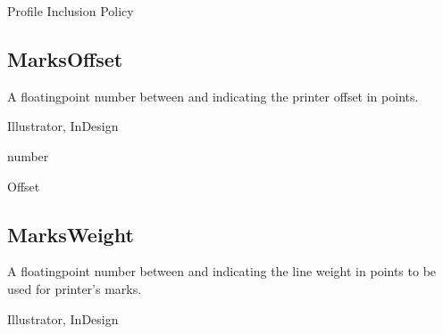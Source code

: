 \documentclass[letterpaper,12pt,english,openany,oneside]{sphinxmanual}
\begin{document}
Profile Inclusion Policy

\label{\detokenize{PDF_Create_NewNamespaces:default-value-15}}

\begin{sphinxVerbatim}[commandchars=\\\{\}]
\end{sphinxVerbatim}


\subsection{MarksOffset}
\label{\detokenize{PDF_Create_NewNamespaces:marksoffset}}
A floating\sphinxhyphen{}point number between  and  indicating the printer offset in points.

\label{\detokenize{PDF_Create_NewNamespaces:supported-by-17}}

Illustrator, InDesign

\label{\detokenize{PDF_Create_NewNamespaces:type-17}}

number

\label{\detokenize{PDF_Create_NewNamespaces:ui-name-17}}

Offset

\label{\detokenize{PDF_Create_NewNamespaces:default-value-16}}

\begin{sphinxVerbatim}[commandchars=\\\{\}]
\end{sphinxVerbatim}


\subsection{MarksWeight}
\label{\detokenize{PDF_Create_NewNamespaces:marksweight}}
A floating\sphinxhyphen{}point number between  and  indicating the line weight in points to be used for printer’s marks.

\label{\detokenize{PDF_Create_NewNamespaces:supported-by-18}}

Illustrator, InDesign

\label{\detokenize{PDF_Create_NewNamespaces:type-18}}
\end{document}
